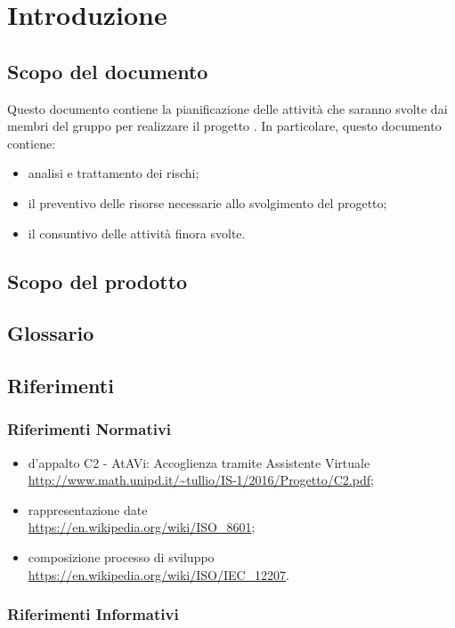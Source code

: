 \section{Introduzione}
	\subsection{Scopo del documento}
	Questo documento contiene la pianificazione delle attività che saranno svolte dai membri del gruppo \GRUPPO per realizzare il progetto \PROGETTO . In particolare, questo documento contiene:
	\begin{itemize}
		\item analisi e trattamento dei rischi;
		\item il preventivo delle risorse necessarie allo svolgimento del progetto;
		\item il consuntivo delle attività finora svolte.
	\end{itemize}	
	\subsection{Scopo del prodotto}
		\SCOPO
	\subsection{Glossario}
		\GLOSSARIO
	\subsection{Riferimenti}
	\subsubsection{Riferimenti Normativi}
		\begin{itemize}
			\item {} d'appalto C2 - AtAVi: Accoglienza tramite Assistente Virtuale \\
			\url{http://www.math.unipd.it/~tullio/IS-1/2016/Progetto/C2.pdf};
			\item rappresentazione date \\
			\url{https://en.wikipedia.org/wiki/ISO_8601};
			\item composizione processo di sviluppo \\
			\url{https://en.wikipedia.org/wiki/ISO/IEC_12207}.

	\end{itemize}
	    \subsubsection{Riferimenti Informativi}